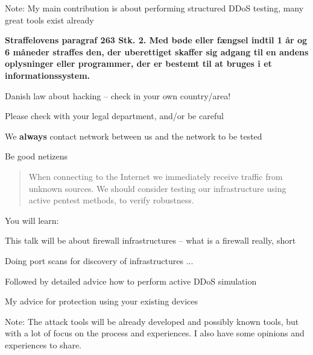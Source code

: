 \documentclass[Screen16to9,17pt]{foils}
\begin{document}
{}

{\small
Note: My main contribution is about performing structured DDoS testing, many great tools exist already}



{\bfseries Straffelovens paragraf 263 Stk. 2. Med bøde eller fængsel indtil 1 år og 6 måneder straffes den, der uberettiget skaffer sig adgang til en andens oplysninger eller programmer, der er bestemt til at bruges i et informationssystem. }

\begin{list2}
\item Danish law about hacking -- check in your own country/area!
\item Please check with your legal department, and/or be careful
\item We {\bf always} contact network between us and the network to be tested
\item Be good netizens
\end{list2}



\begin{quote}
When connecting to the Internet we immediately receive traffic from unknown sources. We should consider testing our infrastructure using active pentest methods, to verify robustness.
\end{quote}


You will learn:
\begin{list2}
\item This talk will be about firewall infrastructures -- what is a firewall really, short
\item Doing port scans for discovery of infrastructures ...
\item Followed by detailed advice how to perform active DDoS simulation
\item My advice for protection using your existing devices
\end{list2}

Note: The attack tools will be already developed and possibly known tools, but with a lot of focus on the process and experiences. I also have some opinions and experiences to share.



\end{document}
